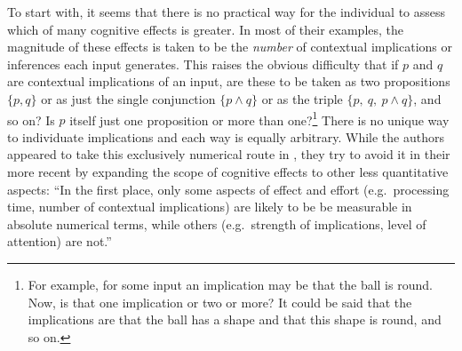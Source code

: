 To start with, it seems that there is no practical way for the individual to assess which of many cognitive effects is greater. In most of their examples, the magnitude of these effects is taken to be the \emph{number} of contextual implications or inferences each input generates. This raises the obvious difficulty that if $p$ and $q$ are contextual implications of an input, are these to be taken as two propositions $\{p, q\}$ or as just the single conjunction $\{p \wedge q\}$ or as the triple $\{p,\ q,\ p \wedge q\}$, and so on? Is $p$ itself just one proposition or more than one?\footnote{For example, for some input an implication may be that the ball is round. Now, is that one implication or two or more? It could be said that the implications are that the ball has a shape and that this shape is round, and so on.} There is no unique way to individuate implications and each way is equally arbitrary. While the authors appeared to take this exclusively numerical route in \citet{sw:r}, they try to avoid it in their more recent \citet[609--610]{sw:rt} by expanding the scope of cognitive effects to other less quantitative aspects: ``In the first place, only some aspects of effect and effort (e.g.\ processing time, number of contextual implications) are likely to be be measurable in absolute numerical terms, while others (e.g.\ strength of implications, level of attention) are not.''


